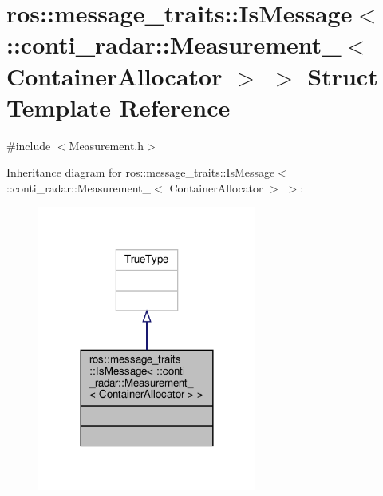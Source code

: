 \hypertarget{structros_1_1message__traits_1_1IsMessage_3_01_1_1conti__radar_1_1Measurement___3_01ContainerAllocator_01_4_01_4}{}\section{ros\+:\+:message\+\_\+traits\+:\+:Is\+Message$<$ \+:\+:conti\+\_\+radar\+:\+:Measurement\+\_\+$<$ Container\+Allocator $>$ $>$ Struct Template Reference}
\label{structros_1_1message__traits_1_1IsMessage_3_01_1_1conti__radar_1_1Measurement___3_01ContainerAllocator_01_4_01_4}


{\ttfamily \#include $<$Measurement.\+h$>$}



Inheritance diagram for ros\+:\+:message\+\_\+traits\+:\+:Is\+Message$<$ \+:\+:conti\+\_\+radar\+:\+:Measurement\+\_\+$<$ Container\+Allocator $>$ $>$\+:\nopagebreak
\begin{figure}[H]
\begin{center}
\leavevmode
\includegraphics[width=204pt]{d0/d82/structros_1_1message__traits_1_1IsMessage_3_01_1_1conti__radar_1_1Measurement___3_01ContainerAll995f1112662aeafc90c3207b85ad02b7}
\end{center}
\end{figure}


